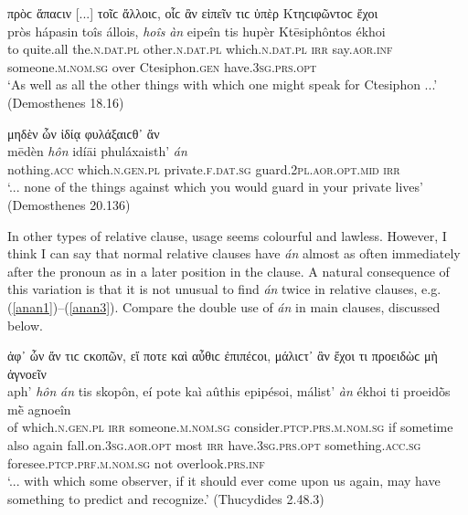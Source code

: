 \begin{exe}
\ex πρὸϲ ἅπαϲιν {[}...{]} τοῖϲ ἄλλοιϲ, οἷϲ ἂν εἰπεῖν τιϲ ὑπὲρ Κτηϲιφῶντοϲ ἔχοι\\
\gll pròs hápasin toîs állois, \emph{hoîs} \emph{àn} eipeîn tis hupèr Ktēsiphôntos ékhoi\\
to quite.all the.\textsc{n.dat.pl} other.\textsc{n.dat.pl} which.\textsc{n.dat.pl} \textsc{irr} say.\textsc{aor.inf} someone.\textsc{m.nom.sg} over Ctesiphon.\textsc{gen} have.\textsc{3sg.prs.opt}\\
\trans `As well as all the other things with which one might speak for Ctesiphon ...' (Demosthenes 18.16)
\label{relan74}
\end{exe}

\begin{exe}
\ex μηδὲν ὧν ἰδίᾳ φυλάξαιϲθ᾽ ἄν\\
\gll mēdèn \emph{hôn} idíāi phuláxaisth' \emph{án}\\
nothing.\textsc{acc} which.\textsc{n.gen.pl} private.\textsc{f.dat.sg}
guard.\textsc{2pl.aor.opt.mid} \textsc{irr}\\
\trans `... none of the things against which you would guard in your private lives' (Demosthenes 20.136)
\label{relan75}
\end{exe}

In other types of relative clause, usage seems colourful and lawless. However, I think I can say that normal relative clauses have \emph{án} almost as often immediately after the pronoun as in a later position in the clause. A natural consequence of this variation is that it is not unusual to find \emph{án} twice in relative clauses, e.g. (\ref{anan1})--(\ref{anan3}). Compare the double use of \emph{án} in main clauses, discussed below.

\begin{exe}
\ex ἀφ᾽ ὧν ἄν τιϲ ϲκοπῶν, εἴ ποτε καὶ αὖθιϲ ἐπιπέϲοι, μάλιϲτ᾽ ἂν ἔχοι τι προειδὼϲ μὴ ἀγνοεῖν\\
\gll aph' \emph{hôn} \emph{án} tis skopôn, eí pote kaì aûthis epipésoi, málist' \emph{àn} ékhoi ti proeidṑs mḕ agnoeîn\\
of which.\textsc{n.gen.pl} \textsc{irr} someone.\textsc{m.nom.sg} consider.\textsc{ptcp.prs.m.nom.sg} if sometime also again fall.on.\textsc{3sg.aor.opt} most \textsc{irr} have.\textsc{3sg.prs.opt} something.\textsc{acc.sg} foresee.\textsc{ptcp.prf.m.nom.sg} not overlook.\textsc{prs.inf}\\
\trans `... with which some observer, if it should ever come upon us again, may have something to predict and recognize.' (Thucydides 2.48.3)
\label{anan1}
\end{exe}

